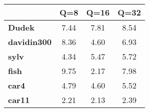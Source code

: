 \begin{tabular}{|l|c|c|c|}
\hline
&\textbf{Q=8}&\textbf{Q=16}&\textbf{Q=32}\\\hline
\textbf{Dudek}&7.44&7.81&8.54\\\hline
\textbf{davidin300}&8.36&4.60&6.93\\\hline
\textbf{sylv}&4.34&5.47&5.72\\\hline
\textbf{fish}&9.75&2.17&7.98\\\hline
\textbf{car4}&4.79&4.60&5.52\\\hline
\textbf{car11}&2.21&2.13&2.39\\\hline
\end{tabular}
